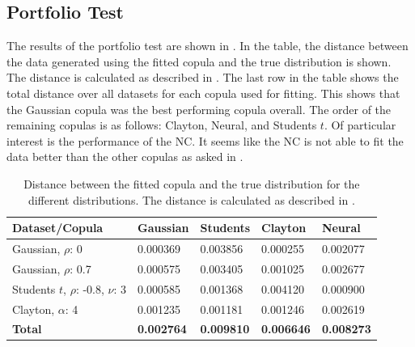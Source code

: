 \subsection{Portfolio Test}
The results of the portfolio test are shown in . In the table, the distance between the data generated using the fitted copula and the true distribution is shown. The distance is calculated as described in . The last row in the table shows the total distance over all datasets for each copula used for fitting. This shows that the Gaussian copula was the best performing copula overall. The order of the remaining copulas is as follows: Clayton, Neural, and Students $t$. Of particular interest is the performance of the \gls{NC}. It seems like the \gls{NC} is not able to fit the data better than the other copulas as asked in \RQthree. 

\begin{table}[h!]
    \centering
    \caption{Distance between the fitted copula and the true distribution for the different distributions. The distance is calculated as described in .}
    \begin{tabular}{lllll}
    \textbf{Dataset/Copula} & \textbf{Gaussian} & \textbf{Students} & \textbf{Clayton} & \textbf{Neural} \\
    \hline
    Gaussian, $\rho$: 0               & 0.000369 & 0.003856 & 0.000255 & 0.002077 \\
    Gaussian, $\rho$: 0.7             & 0.000575 & 0.003405 & 0.001025 & 0.002677 \\
    Students $t$, $\rho$: -0.8, $\nu$: 3 & 0.000585 & 0.001368 & 0.004120 & 0.000900 \\ 
    Clayton, $\alpha$: 4              & 0.001235 & 0.001181 & 0.001246 & 0.002619 \\ %
    \textbf{Total}      & \textbf{0.002764} & \textbf{0.009810} & \textbf{0.006646} & \textbf{0.008273} \\
    \end{tabular}
    \label{tab:DistributionDistances}
\end{table}

